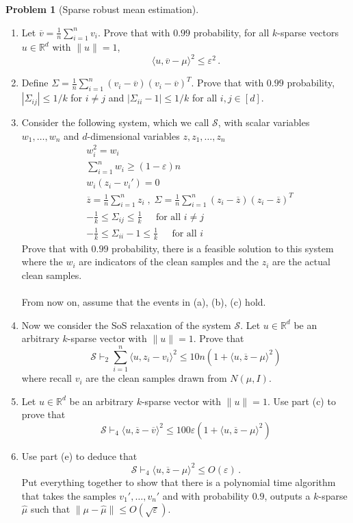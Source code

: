 \documentclass[11pt]{article}
\theoremstyle{definition}
\newtheorem{problem}[theorem]{Problem}
\newcommand{\R}{\mathbb{R}} %
\renewcommand{\epsilon}{\varepsilon}
\begin{document}
\begin{problem}[Sparse robust mean estimation]
  \begin{enumerate}[label=(\alph*)]
    \item Let $\overline{v} = \frac{1}{n} \sum_{i = 1}^n v_i$.  Prove that with $0.99$ probability, for all $k$-sparse vectors $u \in \R^d$ with $\| u \| = 1$,
    \[
    \langle u, \overline{v} - \mu \rangle^2 \leq \epsilon^2 \,.  
    \]
    \item Define $\Sigma = \frac{1}{n} \sum_{i = 1}^n (v_i - \overline{v}) (v_i - \overline{v})^T$. 
     Prove that with $0.99$ probability, $|\Sigma_{ij}| \leq 1/k$ for $i \neq j$ and $| \Sigma_{ii} - 1| \leq 1/k$ for all $i,j \in [d]$.
    \item Consider the following system, which we call $\mathcal{S}$, with scalar variables $w_1, \dots , w_n$ and $d$-dimensional variables $z, z_1, \dots ,  z_n$
    \[
    \begin{split}
    &w_i^2 = w_i \\
    & \sum_{i = 1}^n w_i \geq (1 - \epsilon) n \\
    &w_i(z_i - v_i') = 0 \\
    &\overline{z} =  \frac{1}{n} \sum_{i = 1}^n z_i \; , \; \Sigma = \frac{1}{n} \sum_{i = 1}^n (z_i - \overline{z}) (z_i - \overline{z})^T \\ 
    &-\frac{1}{k} \leq \Sigma_{ij} \leq \frac{1}{k}  \;\;\;\; \text{ for all } i \neq j  \\
    &-\frac{1}{k} \leq \Sigma_{ii} - 1 \leq \frac{1}{k} \;\;\;\; \text{ for all } i
    \end{split}
    \]
    Prove that with $0.99$ probability, there is a feasible solution to this system where the $w_i$ are indicators of the clean samples and the $z_i$ are the actual clean samples.
    \\\\
    From now on, assume that the events in (a), (b), (c) hold.
    \item Now we consider the SoS relaxation of the system $\mathcal{S}$.  Let $u \in \R^d$ be an arbitrary $k$-sparse vector with $\| u \| = 1$.  Prove that 
    \[
    \mathcal{S} \vdash_2 \sum_{i = 1}^n \langle u, z_i - v_i \rangle^2  \leq 10 n (1 + \langle u, \overline{z} - \mu \rangle^2  )
    \]
    where recall $v_i$ are the clean samples drawn from $N(\mu, I)$.    
    \item Let $u \in \R^d$ be an arbitrary $k$-sparse vector with $\| u \| = 1$.  Use part (c) to prove that 
    \[
    \mathcal{S} \vdash_4 \langle u, \overline{z} - \overline{v} \rangle^2 \leq   100 \epsilon  (1 + \langle u, \overline{z} - \mu \rangle^2  )
    \]
    \item Use part (e) to deduce that 
    \[
    \mathcal{S} \vdash_4 \langle u, \overline{z} - \mu \rangle^2 \leq O(\epsilon) \,.
    \]
    Put everything together to show that there is a polynomial time algorithm that takes the samples $v_1', \dots , v_n'$ and with probability $0.9$, outputs a $k$-sparse $\widehat{\mu}$ such that $\| \mu - \widehat{\mu} \| \leq O(\sqrt{\epsilon})$.
  \end{enumerate}

\end{problem}
\end{document}
